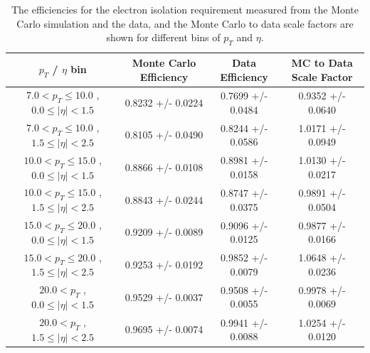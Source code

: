 \documentclass{cmspaper}
\begin{document}
 \begin{table}[!ht]
 \begin{center} 
 \begin{tabular}{|c|c|c|c|}
 \hline
 $p_{T}$ / $\eta$ bin    &  Monte Carlo Efficiency    &  Data Efficiency   &  MC to Data Scale Factor \\   \hline           
$  7.0 < p_{T} \le  10.0$ , $  0.0  \le |\eta| <   1.5$   &       0.8232 +/- 0.0224   &       0.7699 +/- 0.0484   &       0.9352 +/- 0.0640   \\   
\hline
$  7.0 < p_{T} \le  10.0$ , $  1.5  \le |\eta| <   2.5$   &       0.8105 +/- 0.0490   &       0.8244 +/- 0.0586   &       1.0171 +/- 0.0949   \\   
\hline
$ 10.0 < p_{T} \le  15.0$ , $  0.0  \le |\eta| <   1.5$   &       0.8866 +/- 0.0108   &       0.8981 +/- 0.0158   &       1.0130 +/- 0.0217   \\   
\hline
$ 10.0 < p_{T} \le  15.0$ , $  1.5  \le |\eta| <   2.5$   &       0.8843 +/- 0.0244   &       0.8747 +/- 0.0375   &       0.9891 +/- 0.0504   \\   
\hline
$ 15.0 < p_{T} \le  20.0$ , $  0.0  \le |\eta| <   1.5$   &       0.9209 +/- 0.0089   &       0.9096 +/- 0.0125   &       0.9877 +/- 0.0166   \\   
\hline
$ 15.0 < p_{T} \le  20.0$ , $  1.5  \le |\eta| <   2.5$   &       0.9253 +/- 0.0192   &       0.9852 +/- 0.0079   &       1.0648 +/- 0.0236   \\   
\hline
$ 20.0 < p_{T} $ , $  0.0  \le |\eta| <   1.5$   &       0.9529 +/- 0.0037   &       0.9508 +/- 0.0055   &       0.9978 +/- 0.0069   \\   
\hline
$ 20.0 < p_{T} $ , $  1.5  \le |\eta| <   2.5$   &       0.9695 +/- 0.0074   &       0.9941 +/- 0.0088   &       1.0254 +/- 0.0120   \\   
\hline
\end{tabular}
\caption{The efficiencies for the electron isolation requirement measured from the Monte Carlo simulation and the data, and the Monte Carlo
to data scale factors are shown for different bins of $p_{T}$ and $\eta$. }
\label{tab:Efficiency_HZZICHEP2012Iso}
\end{center}
\end{table}
\end{document}
